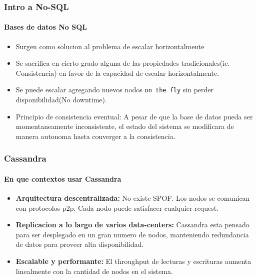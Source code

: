 \documentclass{beamer}
\begin{document}
\begin{frame}
  \frametitle{Intro a No-SQL}    
  \framesubtitle{Bases de datos No SQL}
  \begin{itemize}
    \setlength{\itemsep}{3pt}
    \item Surgen como solucion al problema de escalar horizontalmente
    \pause
    \item Se sacrifica en cierto grado alguna de las propiedades tradicionales(ie. Consistencia) en favor de la capacidad de escalar horizontalmente.
    \pause
    \item Se puede escalar agregando nuevos nodos \texttt{on the fly} sin perder disponibilidad(No downtime).
    \pause
    \item Principio de consistencia eventual: A pesar de que la base de datos pueda ser momentaneamente inconsistente, el estado del sistema se modificara de manera autonoma hasta converger a la consistencia.
  \end{itemize}
\end{frame}

\begin{frame}
  \frametitle{Cassandra}
  \framesubtitle{En que contextos usar Cassandra}
  \begin{itemize}
    \setlength{\itemsep}{3pt}
    \item \textbf{Arquitectura descentralizada:} No existe SPOF. Los nodos se comunican con protocolos p2p. Cada nodo puede satisfacer cualquier request.
    \pause
    \item \textbf{Replicacion a lo largo de varios data-centers: } Cassandra esta pensado para ser desplegado en un gran numero de nodos, manteniendo redundancia de datos para proveer alta disponibilidad.
    \pause
    \item \textbf{Escalable y performante: } El throughput de lecturas y escrituras aumenta linealmente con la cantidad de nodos en el sistema.
  \end{itemize}
\end{frame}
\end{document}
